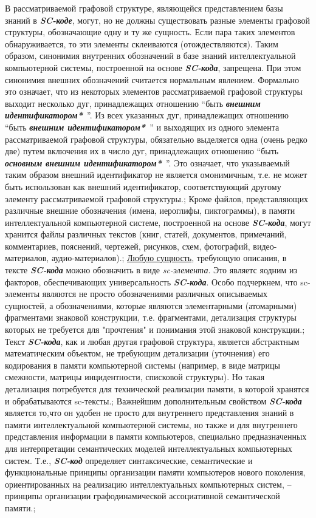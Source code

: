 \begin{SCn}
{В рассматриваемой графовой структуре, являющейся представлением базы знаний в \textit{\textbf{SC-коде}}, могут, но не должны существовать разные элементы графовой структуры, обозначающие одну и ту же сущность. Если пара таких элементов обнаруживается, то эти элементы склеиваются (отождествляются). Таким образом, синонимия внутренних обозначений в базе знаний интеллектуальной компьютерной системы, построенной на основе \textit{\textbf{SC-кода}}, запрещена. При этом синонимия внешних обозначений считается нормальным явлением. Формально это означает, что из некоторых элементов рассматриваемой графовой структуры выходит несколько дуг, принадлежащих отношению ``быть \textit{\textbf{внешним идентификатором*}}~''. Из всех указанных дуг, принадлежащих отношению ``быть \textit{\textbf{внешним идентификатором*}}~'' и выходящих из одного элемента рассматриваемой графовой структуры, обязательно выделяется одна (очень редко две) путем включения их в число дуг, принадлежащих отношению ``быть \textit{\textbf{основным внешним идентификатором*}}~''. Это означает, что указываемый таким образом внешний идентификатор не является омонимичным, т.е. не может быть использован как внешний идентификатор, соответствующий другому элементу рассматриваемой графовой структуры.;
Кроме файлов, представляющих различные внешние обозначения (имена, иероглифы, пиктограммы), в памяти интеллектуальной компьютерной системе, построенной на основе \textit{\textbf{SC-кода}}, могут хранится файлы различных текстов (книг, статей, документов, примечаний, комментариев, пояснений, чертежей, рисунков, схем, фотографий, видео-материалов, аудио-материалов).;
\uline{Любую сущность}, требующую описания, в тексте \textit{\textbf{SC-кода}} можно обозначить в виде \textit{sc-элемента}. Это являетс яодним из факторов, обеспечивающих универсальность \textit{\textbf{SC-кода}}. Особо подчеркнем, что sc-элементы являются не просто обозначениями различных описываемых сущностей, а обозначениями, которые являются элементарными (атомарными) фрагментами знаковой конструкции, т.е. фрагментами, детализация структуры которых не требуется для "прочтения"{} и понимания этой знаковой конструкции.;
Текст \textit{\textbf{SC-кода}}, как и любая другая графовой структура, является абстрактным математическим объектом, не требующим детализации (уточнения) его кодирования в памяти компьютерной системы (например, в виде матрицы смежности, матрицы инцидентности, списковой структуры). Но такая детализация потребуется для технической реализации памяти, в которой хранятся и обрабатываются sc-тексты.;
Важнейшим дополнительным свойством \textit{\textbf{SC-кода}} является то,что он удобен не просто для внутреннего представления знаний в памяти интеллектуальной компьютерной системы, но также и для внутреннего представления информации в памяти компьютеров, специально предназначенных для интерпретации семантических моделей интеллектуальных компьютерных систем. Т.е., \textit{\textbf{SC-код}} определяет синтаксические, семантические и функциональные принципы организации памяти компьютеров нового поколения, ориентированных на реализацию интеллектуальных компьютерных систем, -- принципы организации графодинамической ассоциативной семантической памяти.;
}
\end{SCn}

